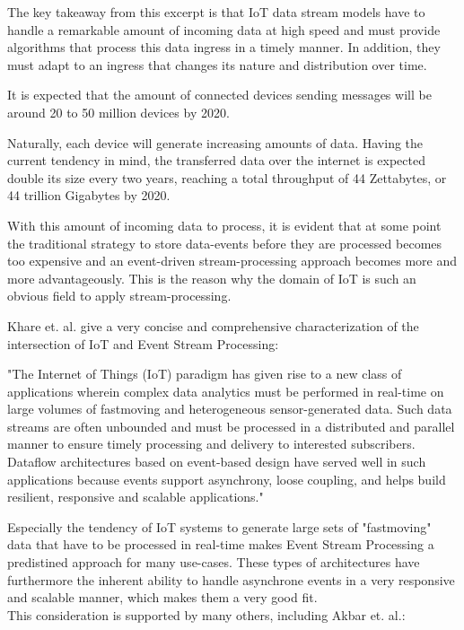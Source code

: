 \begin{enumerate}
    The key takeaway from this excerpt is that IoT data stream models have to handle a remarkable amount of incoming data at high speed and must provide algorithms that process this data ingress in a timely manner. In addition, they must adapt to an ingress that changes its nature and distribution over time. 
    
    It is expected that the amount of connected devices sending messages will be around 20 to 50 million devices by 2020.
    
    Naturally, each device will generate increasing amounts of data. Having the current tendency in mind, the transferred data over the internet is expected double its size every two years, reaching a total throughput of 44 Zettabytes, or 44 trillion Gigabytes by 2020.
    
    With this amount of incoming data to process, it is evident that at some point the traditional strategy to store data-events before they are processed becomes too expensive and an event-driven stream-processing approach becomes more and more advantageously. This is the reason why the domain of IoT is such an obvious field to apply stream-processing.
    
    Khare et. al. give a very concise and comprehensive characterization of the intersection of IoT and Event Stream Processing:
    
    \begin{displayquote}
        "The Internet of Things (IoT) paradigm has given rise to
        a new class of applications wherein complex data analytics
        must be performed in real-time on large volumes of fastmoving
        and heterogeneous sensor-generated data. Such data
        streams are often unbounded and must be processed in a
        distributed and parallel manner to ensure timely processing
        and delivery to interested subscribers. Dataflow architectures
        based on event-based design have served well in
        such applications because events support asynchrony, loose
        coupling, and helps build resilient, responsive and scalable
        applications."\autocite{Khare2015ReactivePublish/subscribe}
    \end{displayquote}
    
    Especially the tendency of IoT systems to generate large sets of "fastmoving" data that have to be processed in real-time makes Event Stream Processing a predistined approach for many use-cases. These types of architectures have furthermore the inherent ability to handle asynchrone events in a very responsive and scalable manner, which makes them a very good fit.\\
    This consideration is supported by many others, including Akbar et. al.:
    

\end{enumerate}
